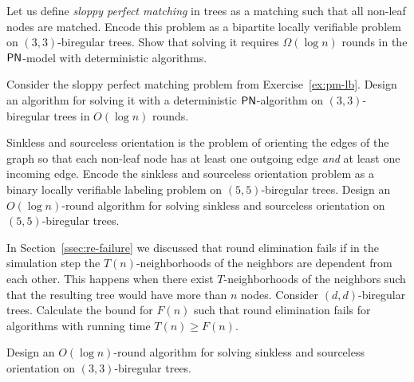 \begin{ex}\label{ex:pm-lb}
	Let us define \emph{sloppy perfect matching} in trees as a matching such that all non-leaf nodes are matched. Encode this problem as a bipartite locally verifiable problem on $(3,3)$-biregular trees. Show that solving it requires $\Omega(\log n)$ rounds in the $\textup{\sffamily PN}$-model with deterministic algorithms.
\end{ex}

\begin{ex}\label{ex:pm-ub}
	Consider the sloppy perfect matching problem from Exercise~\ref{ex:pm-lb}.
	Design an algorithm for solving it with a deterministic $\textup{\sffamily PN}$-algorithm on $(3,3)$-biregular trees in $O(\log n)$ rounds.
\end{ex}

\begin{ex}\label{ex:sinkless-sourceless}
	Sinkless and sourceless orientation is the problem of orienting the edges of the graph so that each non-leaf node has at least one outgoing edge \emph{and} at least one incoming edge.
	Encode the sinkless and sourceless orientation problem as a binary locally verifiable labeling problem on $(5,5)$-biregular trees.
	Design an $O(\log n)$-round algorithm for solving sinkless and sourceless orientation on $(5,5)$-biregular trees.
\end{ex}

\begin{ex} \label{ex:re-boundary}
	In Section~\ref{ssec:re-failure} we discussed that round elimination fails if in the simulation step the $T(n)$-neighborhoods of the neighbors are dependent from each other. This happens when there exist $T$-neighborhoods of the neighbors such that the resulting tree would have more than $n$ nodes.
	Consider $(d,d)$-biregular trees. Calculate the bound for $F(n)$ such that round elimination fails for algorithms with running time $T(n) \geq F(n)$.
\end{ex}

\begin{exs}\label{ex:sinkless-sourceless-3}
	Design an $O(\log n)$-round algorithm for solving sinkless and sourceless orientation on $(3,3)$-biregular trees.
\end{exs}

